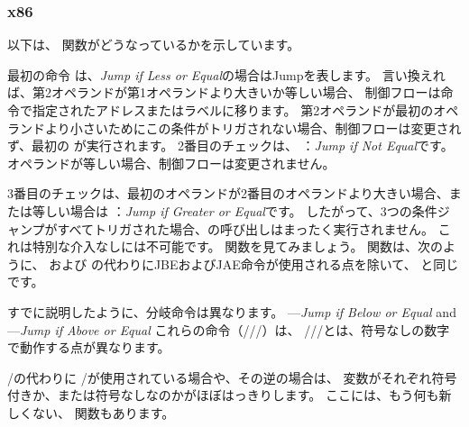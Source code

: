 \subsubsection{x86}


以下は、 関数がどうなっているかを示しています。




最初の命令 \JLE は、\emph{Jump if Less or Equal}の場合はJumpを表します。 
言い換えれば、第2オペランドが第1オペランドより大きいか等しい場合、
制御フローは命令で指定されたアドレスまたはラベルに移ります。 
第2オペランドが最初のオペランドより小さいためにこの条件がトリガされない場合、制御フローは変更されず、最初の \printf が実行されます。 
2番目のチェックは、 \JNE ：\emph{Jump if Not Equal}です。 
オペランドが等しい場合、制御フローは変更されません。

3番目のチェックは、最初のオペランドが2番目のオペランドより大きい場合、または等しい場合は \JGE ：\emph{Jump if Greater or Equal}です。 
したがって、3つの条件ジャンプがすべてトリガされた場合、\printf の呼び出しはまったく実行されません。 
これは特別な介入なしには不可能です。 
関数を見てみましょう。 
関数は、次のように、 \JLE および \JGE の代わりにJBEおよびJAE命令が使用される点を除いて、
と同じです。




すでに説明したように、分岐命令は異なります。
\JBE---\emph{Jump if Below or Equal} and \JAE---\emph{Jump if Above or Equal}
これらの命令（/\JAE/\JB/\JBE）は、 \JG/\JGE/\JL/\JLE とは、符号なしの数字で動作する点が異なります。


/\JB の代わりに \JG/\JL が使用されている場合や、その逆の場合は、
変数がそれぞれ符号付きか、または符号なしなのかがほぼはっきりします。
ここには、もう何も新しくない、 \main 関数もあります。



